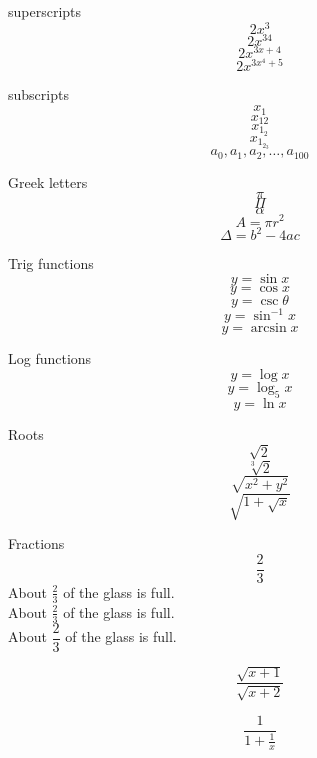 \documentclass[11pt]{article}
\begin{document}
\begin{comment}
  this is a multi-line
  comment
\end{comment}

superscripts $$2x^3$$
$$2x^{34}$$
$$2x^{3x+4}$$
$$2x^{3x^4+5}$$

subscripts
$$x_1$$
$$x_{12}$$
$$x_{1_2}$$
$$x_{1_{2_3}}$$
$$a_0, a_1, a_2, \ldots, a_{100}$$

Greek letters
$$\pi$$
$$\Pi$$
$$\alpha$$
$$A=\pi r^2$$
$$\Delta=b^2-4ac$$

Trig functions
$$y=\sin x$$
$$y=\cos x$$
$$y=\csc \theta$$
$$y=\sin^{-1} x$$
$$y=\arcsin x$$

Log functions
$$y=\log x$$
$$y=\log_5 x$$
$$y=\ln x$$

Roots
$$\sqrt{2}$$
$$\sqrt[3]{2}$$
$$\sqrt{x^2+y^2}$$
$$\sqrt{1+\sqrt{x}}$$

Fractions
$$\frac{2}{3}$$
About $\displaystyle \frac{2}{3}$ of the glass is full.\\[16pt]
About $\frac{2}{3}$ of the glass is full.\\[6pt]
About $\dfrac{2}{3}$ of the glass is full.

$$\frac{\sqrt{x+1}}{\sqrt{x+2}}$$

$$\frac{1}{1+\frac{1}{x}}$$
\end{document}
